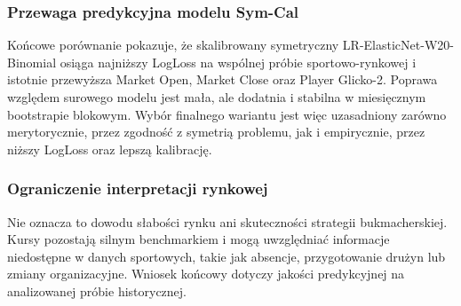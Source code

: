 \subsubsection{Przewaga predykcyjna modelu Sym-Cal}

Końcowe porównanie pokazuje, że skalibrowany symetryczny LR-ElasticNet-W20-Binomial osiąga najniższy
LogLoss na wspólnej próbie sportowo-rynkowej i istotnie przewyższa Market Open, Market Close oraz
Player Glicko-2. Poprawa względem surowego modelu jest mała, ale dodatnia i stabilna w miesięcznym
bootstrapie blokowym. Wybór finalnego wariantu jest więc uzasadniony zarówno merytorycznie, przez
zgodność z symetrią problemu, jak i empirycznie, przez niższy LogLoss oraz lepszą kalibrację.

\subsubsection{Ograniczenie interpretacji rynkowej}

Nie oznacza to dowodu słabości rynku ani skuteczności strategii bukmacherskiej. Kursy pozostają
silnym benchmarkiem i mogą uwzględniać informacje niedostępne w danych sportowych, takie jak
absencje, przygotowanie drużyn lub zmiany organizacyjne. Wniosek końcowy dotyczy jakości
predykcyjnej na analizowanej próbie historycznej.

